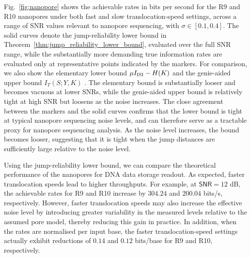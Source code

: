\documentclass[onecolumn]{IEEEtran}
\theoremstyle{definition}
\begin{document}
Fig.~\ref{fig:nanopore} shows the achievable rates in bits per second for the R9 and R10 nanopores under both fast and slow translocation-speed settings, across a range of SNR values relevant to nanopore sequencing, with $\sigma \in [0.1,0.4]$. {
The solid curves denote the jump-reliability lower bound in
Theorem~\ref{thm:jump_reliability_lower_bound}, evaluated over the full SNR
range, while the substantially more demanding true information rates are
evaluated only at representative points indicated by the markers. For
comparison, we also show the elementary lower bound
$\mu I_{\rm ISI}-H(K)$ and the genie-aided upper bound
$I_T(S;Y,K)$ \cite{McBain2024a}. The elementary bound is substantially
looser and becomes vacuous at lower SNRs, while the genie-aided upper bound
is relatively tight at high SNR but loosens as the noise increases.
} The close agreement between the markers and the solid curves confirms that the lower bound is tight at typical nanopore sequencing noise levels, and can therefore serve as a tractable proxy for nanopore sequencing analysis. As the noise level increases, the bound becomes looser, suggesting that it is tight when the jump distances are sufficiently large relative to the noise level.

Using the jump-reliability lower bound, we can compare the theoretical performance of the nanopores for DNA data storage readout. As expected, faster translocation speeds lead to higher throughputs. For example, at $\mathsf{SNR}=12$ dB, the achievable rates for R9 and R10 increase by $304.24$ and $200.04$ bits/s, respectively. However, faster translocation speeds may also increase the effective noise level by introducing greater variability in the measured levels relative to the assumed pore model, thereby reducing this gain in practice. In addition, when the rates are normalised per input base, the faster translocation-speed settings actually exhibit reductions of $0.14$ and $0.12$ bits/base for R9 and R10, respectively.
\end{document}
